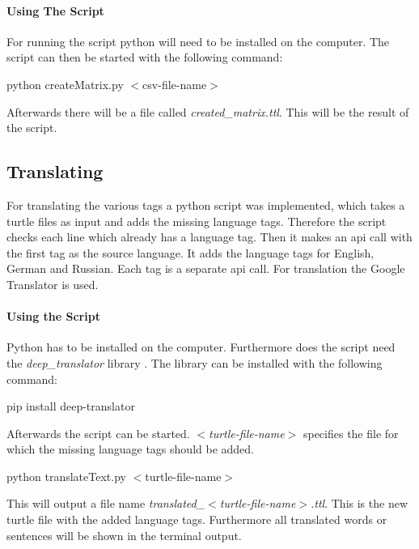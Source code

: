 \documentclass[11pt,a4paper]{article}
\begin{document}
\paragraph{Using The Script}

For running the script python will need to be installed on the computer.  The
script can then be started with the following command:

\begin{center}
    python createMatrix.py $<$csv-file-name$>$
\end{center}

Afterwards there will be a file called \textit{created\_matrix.ttl}.  This
will be the result of the script.

\subsection{Translating}

For translating the various tags a python script was implemented, which takes
a turtle files as input and adds the missing language tags.  Therefore the
script checks each line which already has a language tag.  Then it makes an
api call with the first tag as the source language.  It adds the language tags
for English, German and Russian.  Each tag is a separate api call.  For
translation the Google Translator is used.

\paragraph{Using the Script}

Python has to be installed on the computer.  Furthermore does the script need
the \textit{deep\_translator} library \cite{deep_translator}.  The library can
be installed with the following command:

\begin{center}
    pip install deep-translator
\end{center}

Afterwards the script can be started.  \textit{$<$turtle-file-name$>$}
specifies the file for which the missing language tags should be added.

\begin{center}
    python translateText.py $<$turtle-file-name$>$
\end{center}

This will output a file name \textit{translated\_$<$turtle-file-name$>$.ttl}.
This is the new turtle file with the added language tags.  Furthermore all
translated words or sentences will be shown in the terminal output.
\end{document}
